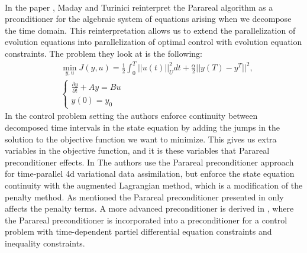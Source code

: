 \\
In the paper \cite{maday2002parareal}, Maday and Turinici reinterpret the Parareal algorithm as a prconditioner for the algebraic system of equations arising when we decompose the time domain. This reinterpretation allows us to extend the parallelization of evolution equations into parallelization of optimal control with evolution equation constraints. The problem they look at is the following:
\begin{align*}
&\min_{y,u}J(y,u) = \frac{1}{2}\int_0^T||u(t)||_U^2dt + \frac{\alpha}{2}||y(T)-y^T||^2,\\
&\left\{
     \begin{array}{lr}
       	\frac{\partial y}{\partial t}+Ay = Bu\\
       	   y(0)=y_0
     \end{array}
   \right.
\end{align*}
In the control problem setting the authors enforce continuity between decomposed time intervals in the state equation by adding the jumps in the solution to the objective function we want to minimize. This gives us extra variables in the objective function, and it is these variables that Parareal preconditioner effects. In \cite{rao2016time} The authors use the Parareal preconditioner approach for time-parallel 4d variational data assimilation, but enforce the state equation continuity with the augmented Lagrangian method, which is a modification of the penalty method\cite{nocedal2006numerical}. As mentioned the Parareal preconditioner presented in \cite{maday2002parareal} only affects the penalty terms. A more advanced preconditioner is derived in \cite{ulbrich2015preconditioners}, where the Parareal preconditioner is incorporated into a preconditioner for a control problem with time-dependent partiel differential equation constraints and inequality constraints.